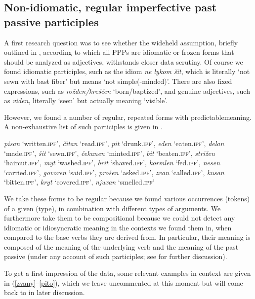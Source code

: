 \documentclass[output=paper,modfonts,newtxmath,hidelinks
\ChapterDOI{10.5281/zenodo.2545513}
]{langscibook}
\begin{document}
\subsection{Non-idiomatic, regular imperfective past passive participles} 
\label{nonidiom}

A first research question was to see whether the wideheld assumption, briefly outlined in , according to which all  PPPs are idiomatic or frozen forms that should be analyzed as adjectives, withstands closer data scrutiny. Of course we found idiomatic participles, such as the idiom \textit{ne lykom šit}, which is literally `not sewn with bast fiber' but means `not simple(-minded)'. There are also fixed expressions, such as \textit{rožden/kreščen} `born/baptized', and genuine adjectives, such as \textit{viden}, literally `seen' but actually meaning `visible'.

However, we found a number of regular, repeated forms with predictable\linebreak meaning. A non-exhaustive list of such participles is given in .

\ea	\textit{pisan} `written.\textsc{ipf}', \textit{čitan} `read.\textsc{ipf}', \textit{pit} `drunk.\textsc{ipf}', \textit{eden} `eaten.\textsc{ipf}', \textit{delan} `made.\textsc{ipf}', \textit{šit} `sewn.\textsc{ipf}', \textit{čekanen} `minted.\textsc{ipf}', \textit{bit} `beaten.\textsc{ipf}', \textit{strižen} `haircut.\textsc{ipf}', \textit{myt} `washed.\textsc{ipf}', \textit{brit} `shaved.\textsc{ipf}', \textit{kormlen} `fed.\textsc{ipf}', \textit{nesen} `carried.\textsc{ipf}', \textit{govoren} `said.\textsc{ipf}', \textit{prošen} `asked.\textsc{ipf}', \textit{zvan} `called.\textsc{ipf}', \textit{kusan} `bitten.\textsc{ipf}', \textit{kryt} `covered.\textsc{ipf}', \textit{njuxan} `smelled.\textsc{ipf}' \label{list}
\z

\noindent We take these forms to be regular because we found various occurrences (tokens) of a given  (type), in combination with different types of arguments. We furthermore take them to be compositional because we could not detect any idiomatic or idiosyncratic meaning in the contexts we found them in, when compared to the base verbs they are derived from. In particular, their meaning is composed of the meaning of the underlying verb and the meaning of the past passive  (under any account of such participles; see  for further discussion). 

To get a first impression of the data, some relevant examples in context are given in (\ref{zvany}--\ref{pito}), which we leave uncommented at this moment but will come back to in later discussion. 
\end{document}
